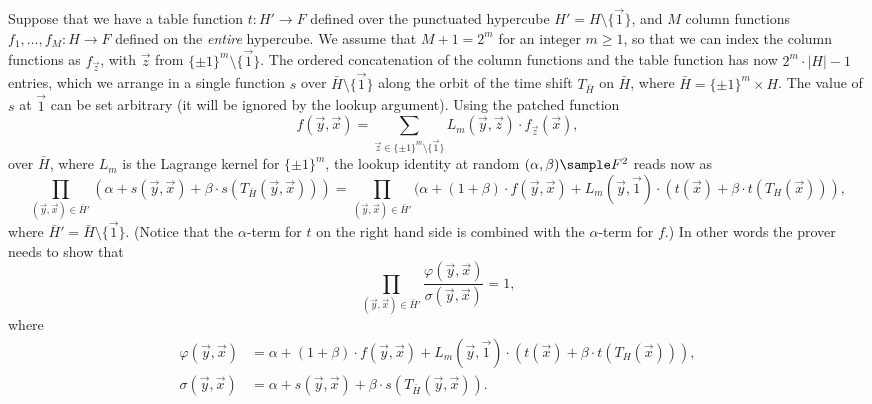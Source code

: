 \documentclass[11pt]{article}
\theoremstyle{definition}
\theoremstyle{definition}
\begin{document}
Suppose that we have a table function $t:H'\rightarrow F$ defined over the punctuated hypercube $H' = H\setminus\{\vec 1\}$, and $M$ column functions $f_1,\ldots, f_M: H\rightarrow F$ defined on the \textit{entire} hypercube.
We assume that  $M + 1=2^m $ for an integer $m\geq 1$, so that we can index the column functions as $f_{\vec z}$, with $\vec z$ from $\{\pm 1\}^m \setminus \{\vec 1\}$.
The ordered concatenation of the column functions and the table function has now $2^m \cdot |H| - 1$ entries, which we arrange in a single function $s$ over $\bar H\setminus \{\vec 1\}$ along the orbit of the time shift $T_{\bar H}$ on $\bar H$, where  $\bar H = \{\pm 1\}^m\times H$.
The value of $s$ at $\vec 1$ can be set arbitrary (it will be ignored by the lookup argument).
Using the patched  function
\[
f(\vec y, \vec x) = \sum_{\vec z \in \{\pm 1\}^m\setminus\{\vec 1\}} L_m(\vec y, \vec z)\cdot f_{\vec z}(\vec x),
\]
over $\bar H$, where $L_m$ is the Lagrange kernel for $\{\pm 1\}^m$, the lookup identity at random $(\alpha,\beta)\sample F^2$ reads now as
\[
\prod_{(\vec y, \vec x)\in \bar H'}  (\alpha + s(\vec y, \vec x) + \beta\cdot s(T_{\bar H} (\vec y, \vec x))) = \prod_{(\vec y, \vec x)\in \bar H'}  (\alpha + (1 + \beta)\cdot f(\vec y, \vec x) + L_{m}(\vec y, \vec 1)\cdot (t(\vec x) + \beta \cdot t(T_H(\vec x))),
\]
where $\bar H' = \bar H\setminus\{\vec 1\}$.
(Notice that the $\alpha$-term for $t$ on the right hand side is combined with the $\alpha$-term for $f$.)
In other words the prover needs to show that
\[
\prod_{(\vec y, \vec x)\in \bar H'}\frac{\varphi(\vec y, \vec x)}{\sigma(\vec y,\vec x)} = 1,
\]
where 
\begin{align*}
\varphi(\vec y, \vec x) &= \alpha + (1+\beta)\cdot f(\vec y, \vec x) + L_m(\vec y, \vec 1)\cdot (t(\vec x) + \beta \cdot t(T_H(\vec x))), 
\\
\sigma(\vec y, \vec x) &= \alpha + s(\vec y, \vec x) + \beta\cdot s(T_{\bar H} (\vec y, \vec x)).
\end{align*} 
\end{document}
